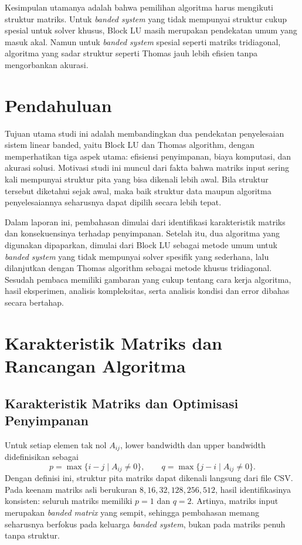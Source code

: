 \documentclass[12pt,a4paper]{article}
\begin{document}
Kesimpulan utamanya adalah bahwa pemilihan algoritma harus mengikuti struktur matriks. Untuk \emph{banded system} yang tidak mempunyai struktur cukup spesial untuk solver khusus, Block LU masih merupakan pendekatan umum yang masuk akal. Namun untuk \emph{banded system} spesial seperti matriks tridiagonal, algoritma yang sadar struktur seperti Thomas jauh lebih efisien tanpa mengorbankan akurasi.

\section{Pendahuluan}
Tujuan utama studi ini adalah membandingkan dua pendekatan penyelesaian sistem linear banded, yaitu Block LU dan Thomas algorithm, dengan memperhatikan tiga aspek utama: efisiensi penyimpanan, biaya komputasi, dan akurasi solusi. Motivasi studi ini muncul dari fakta bahwa matriks input sering kali mempunyai struktur pita yang bisa dikenali lebih awal. Bila struktur tersebut diketahui sejak awal, maka baik struktur data maupun algoritma penyelesaiannya seharusnya dapat dipilih secara lebih tepat.

Dalam laporan ini, pembahasan dimulai dari identifikasi karakteristik matriks dan konsekuensinya terhadap penyimpanan. Setelah itu, dua algoritma yang digunakan dipaparkan, dimulai dari Block LU sebagai metode umum untuk \emph{banded system} yang tidak mempunyai solver spesifik yang sederhana, lalu dilanjutkan dengan Thomas algorithm sebagai metode khusus tridiagonal. Sesudah pembaca memiliki gambaran yang cukup tentang cara kerja algoritma, hasil eksperimen, analisis kompleksitas, serta analisis kondisi dan error dibahas secara bertahap.

\section{Karakteristik Matriks dan Rancangan Algoritma}
\subsection{Karakteristik Matriks dan Optimisasi Penyimpanan}
Untuk setiap elemen tak nol $A_{ij}$, lower bandwidth dan upper bandwidth didefinisikan sebagai
\[
p=\max\{i-j \mid A_{ij}\neq 0\}, \qquad q=\max\{j-i \mid A_{ij}\neq 0\}.
\]
Dengan definisi ini, struktur pita matriks dapat dikenali langsung dari file CSV. Pada keenam matriks asli berukuran $8,16,32,128,256,512$, hasil identifikasinya konsisten: seluruh matriks memiliki \textbf{$p=1$} dan \textbf{$q=2$}. Artinya, matriks input merupakan \emph{banded matrix} yang sempit, sehingga pembahasan memang seharusnya berfokus pada keluarga \emph{banded system}, bukan pada matriks penuh tanpa struktur.
\end{document}
